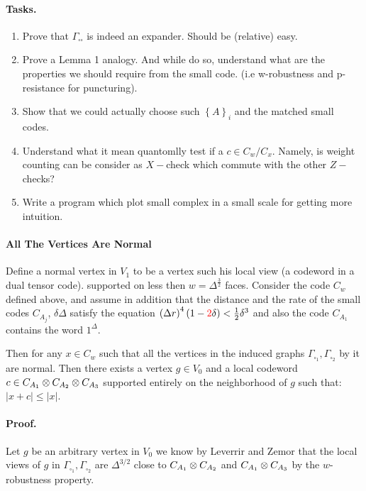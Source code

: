 \documentclass{article}
\begin{document}
\begin{multicols*}{2}
	\paragraph{Tasks.}
	\begin{enumerate}
	  \item Prove that $\Gamma_{\square \square } $ is indeed an expander. Should be (relative) easy.
	  \item Prove a Lemma 1 analogy. And while do so, understand what are the properties we should require from the small code.
	    (i.e w-robustness and p-resistance for puncturing). 
	  \item Show that we could actually choose such $\left\{ A \right\}_{i}$ and the matched small codes.
	  \item Understand what it mean quantomlly test if a $c \in C_{w}/ C_{x}$. Namely, is weight counting can be consider as 
	    $X-$check which commute with the other $Z-$checks? 
	  \item Write a program which plot small complex in a small scale for getting more intuition. 
	\end{enumerate}

	
	\paragraph{All The Vertices Are Normal } Define a normal vertex in $ V_{1} $ to be a vertex such his local view (a codeword in a dual tensor code). 
	supported on less then $w = \Delta^\frac{3}{2}$ faces.
	Consider the code $C_{w}$ defined above, and assume in addition that the distance and the rate of 
	the small codes $C_{A_{j}}$, $\delta \Delta$ satisfy the equation $ \left(\Delta r\right)^{4}\left(1 - \color{red}2\color{black}\delta\right) < \frac{1}{2}\delta^{3} $ and also the code $ C_{A_{1}}  $ 
      contains the word $ 1^{\Delta} $.


      Then for any $x \in C_{w}$ such that all the vertices in the induced graphs $\Gamma_{\square_{1}},\Gamma_{\square_{2}}$  by it are normal. 
	Then there exists a vertex $ g \in V_{0} $ and a local codeword $ c \in C_{A_{1}} \otimes C_{A_{2}} \otimes C_{A_{3}} $ supported entirely on the neighborhood of $ g $ such that: 
	$ |x + c| \le |x| $.


	\paragraph{Proof.} Let $g$ be an arbitrary vertex in $V_{0}$ we know by Leverrir and Zemor that the local views of $g$ in  $\Gamma_{\square_{1}},\Gamma_{\square_{2}}$ are $\Delta^{3/2}$ close to 
      $C_{A_{1}} \otimes C_{A_{2}} $ and $ C_{A_{1}} \otimes C_{A_{3}} $ by the $w$-robustness property. 


\end{multicols*}
\end{document}
